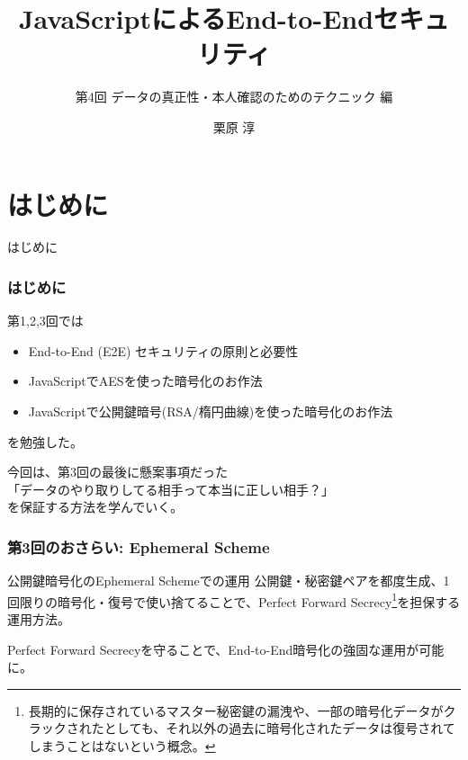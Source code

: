 \documentclass[12pt,dvipdfmx]{beamer}
\title[E2E Security with JS 04]{JavaScriptによるEnd-to-Endセキュリティ}
\subtitle{第4回 データの真正性・本人確認のためのテクニック 編}
\author[Jun Kurihara]{栗原 淳}
\institute[]{}
\date[]{}
\begin{document}
\begin{frame}
\titlepage
\end{frame}

\section{はじめに}
\begin{frame}
 \centering
 {\Large はじめに}
\end{frame}

\begin{frame}
\frametitle{はじめに}
第1,2,3回では
\begin{itemize}
 \item End-to-End (E2E) セキュリティの原則と必要性
 \item JavaScriptでAESを使った暗号化のお作法
 \item JavaScriptで公開鍵暗号(RSA/楕円曲線)を使った暗号化のお作法
\end{itemize}
を勉強した。

\vspace{2ex}

今回は、第3回の最後に懸案事項だった\\
\alert{「データのやり取りしてる相手って本当に正しい相手？」}\\
を保証する方法を学んでいく。
\end{frame}


\begin{frame}
\frametitle{第3回のおさらい: Ephemeral Scheme}
\begin{block}{\small 公開鍵暗号化のEphemeral Schemeでの運用}
公開鍵・秘密鍵ペアを都度生成、1回限りの暗号化・復号で使い捨てることで、\alert{Perfect Forward Secrecy}\footnote[frame]{\scriptsize 長期的に保存されているマスター秘密鍵の漏洩や、一部の暗号化データがクラックされたとしても、\alert{それ以外の過去に暗号化されたデータは復号されてしまうことはない}という概念。}を担保する運用方法。
\end{block}

Perfect Forward Secrecyを守ることで、End-to-End暗号化の強固な運用が可能に。
\end{frame}
\end{document}
